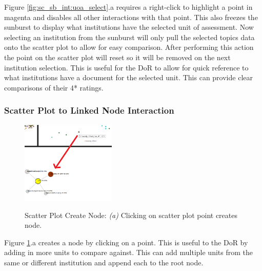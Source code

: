 \documentclass[a4paper, 11pt]{article}
\begin{document}
\noindent Figure \ref{fig:sc_sb_int:uoa_select}.a requires a right-click to highlight a point in magenta and disables all other interactions with that point. This also freezes the sunburst to display what institutions have the selected unit of assessment. Now selecting an institution from the sunburst will only pull the selected topics data onto the scatter plot to allow for easy comparison. After performing this action the point on the scatter plot will reset so it will be removed on the next institution selection. This is useful for the DoR to allow for quick reference to what institutions have a document for the selected unit. This can provide clear comparisons of their 4* ratings.


\subsubsection{Scatter Plot to Linked Node Interaction}
\begin{figure}[hbt!]
	\centering
      \includegraphics[width=0.4\textwidth]{imgs/sc_ln_int/SC_LN_create_node.png} \\
	\caption{Scatter Plot Create Node: 
	\textit{(a)} Clicking on scatter plot point creates node.}
    \label{fig:sc_ln_int:create_node}
     \noindent\makebox[\linewidth]{\rule{\textwidth}{0.4pt}}
\end{figure}

\noindent Figure \ref{fig:sc_ln_int:create_node}.a creates a node by clicking on a point. This is useful to the DoR by adding in more units to compare against. This can add multiple units from the same or different institution and append each to the root node.
\end{document}
